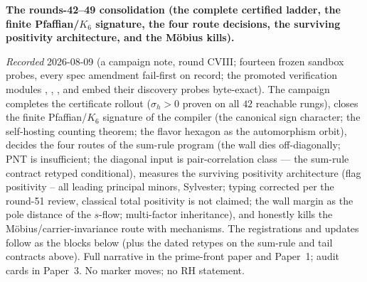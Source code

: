 \documentclass[11pt,a4paper]{article}
\begin{document}
\par\smallskip\noindent\textbf{The rounds-42--49 consolidation
(the complete certified ladder, the finite Pfaffian/$K_6$
signature, the four route decisions, the surviving positivity
architecture, and the M\"obius kills).}
{\sloppy
\emph{Recorded} 2026-08-09 (a campaign note, round CVIII;
fourteen frozen sandbox probes, every spec amendment fail-first
on record; the promoted verification modules
,
,
,
 and
 embed their discovery
probes byte-exact).  The campaign completes the certificate
rollout ($\sigma_h > 0$ proven on all $42$ reachable rungs),
closes the finite Pfaffian/$K_6$ signature of the compiler (the
canonical sign character; the self-hosting counting theorem;
the flavor hexagon as the automorphism orbit), decides the four
routes of the sum-rule program (the wall dies off-diagonally;
PNT is insufficient; the diagonal input is pair-correlation
class --- the sum-rule contract retyped conditional), measures
the surviving positivity architecture (flag positivity -- all leading principal minors, Sylvester; typing corrected per the round-51 review, classical total positivity is not claimed; the
wall margin as the pole distance of the $s$-flow; multi-factor
inheritance), and honestly kills the
M\"obius/carrier-invariance route with mechanisms.  The
registrations and updates follow as the blocks below (plus the
dated retypes on the sum-rule and tail contracts above).  Full
narrative in the prime-front paper and Paper~1; audit cards in
Paper~3.  No marker moves; no RH statement.\par}
\end{document}
